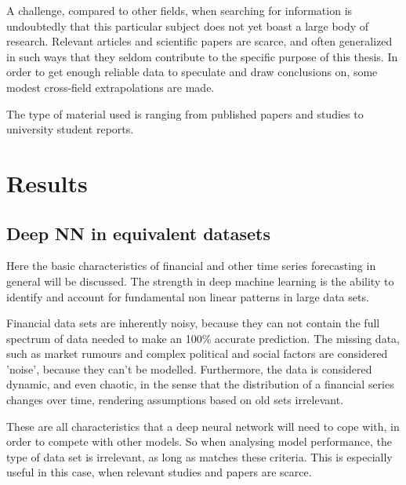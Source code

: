 
A challenge, compared to other fields, when searching for information is undoubtedly that this particular subject does not yet boast a large body of research. Relevant articles and scientific papers are scarce, and often generalized in such ways that they seldom contribute to the specific purpose of this thesis. In order to get enough reliable data to speculate and draw conclusions on, some modest cross-field extrapolations are made.

The type of material used is ranging from published papers and studies to university student reports.



\newpage

\section{Results}
\subsection{Deep NN in equivalent datasets}

Here the basic characteristics of financial and other time series forecasting in general will be discussed.
The strength in deep machine learning is the ability to identify and account for fundamental non linear patterns in large data sets.

Financial data sets are inherently noisy, because they can not contain the full spectrum of data needed to make an 100\% accurate prediction. The missing data, such as market rumours and complex political and social factors are considered 'noise', because they can't be modelled. Furthermore, the data is considered dynamic, and even chaotic, in the sense that the distribution of a financial series changes over time, rendering assumptions based on old sets irrelevant. 

These are all characteristics that a deep neural network will need to cope with, in order to compete with other models. So when analysing model performance, the type of data set is irrelevant, as long as matches these criteria. This is especially useful in this case, when relevant studies and papers are scarce.

